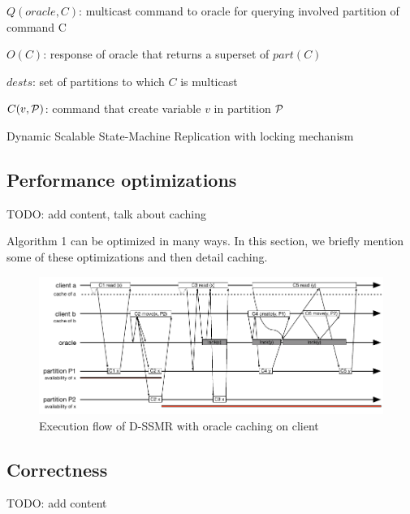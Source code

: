 \begin{algorithm}
\begin{distribalgo}[1]
$Q(oracle, C)$: multicast command to oracle for querying involved partition of command C

\vspace{1mm}

$O(C)$: response of oracle that returns a superset of $part(C)$

\vspace{1mm}

$dests$: set of partitions to which $C$ is multicast

\vspace{1mm}

$C(v, \mathcal{P})$: command that create variable $v$ in partition $\mathcal{P}$

\caption{Dynamic Scalable State-Machine Replication with locking mechanism}
\label{alg:dssmr}
\end{distribalgo}
\end{algorithm}

\subsection{Performance optimizations}
\label{sec:optm}
TODO: add content, talk about caching

Algorithm 1 can be optimized in many ways. In this section, we briefly mention some of these optimizations and then detail caching.

\begin{figure}
\begin{minipage}[b]{1\linewidth} %
\centering
      \includegraphics[width=0.85\linewidth]{figures/cache}
\end{minipage}
\caption{Execution flow of D-SSMR with oracle caching on client}
\label{fig:cache}
\end{figure}


\subsection{Correctness}
\label{sec:correctness}
TODO: add content